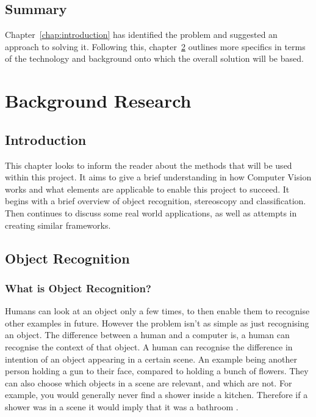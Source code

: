 \documentclass[11pt,oneside]{report}
\begin{document}
		\section{Summary}
		Chapter~\ref{chap:introduction} has identified the problem and suggested an approach to solving it.
		Following this, chapter~\ref{chap:background} outlines more specifics in terms of the technology and background onto which the overall solution will be based.
		
	\chapter{Background Research}\label{chap:background}
			\section{Introduction}
			This chapter looks to inform the reader about the methods that will be used within this project.
			It aims to give a brief understanding in how Computer Vision works and what elements are applicable to enable this project to succeed.
			It begins with a brief overview of object recognition, stereoscopy and classification.
			Then continues to discuss some real world applications, as well as attempts in creating similar frameworks.
			

			\section{Object Recognition}
				\subsection{What is Object Recognition?}
				Humans can look at an object only a few times, to then enable them to recognise other examples in future.
				However the problem isn't as simple as just recognising an object.
				The difference between a human and a computer is, a human can recognise the context of that object.
				A human can recognise the difference in intention of an object appearing in a certain scene.
				An example being another person holding a gun to their face, compared to holding a bunch of flowers.
				They can also choose which objects in a scene are relevant, and which are not.
				For example, you would generally never find a shower inside a kitchen.
				Therefore if a shower was in a scene it would imply that it was a bathroom \cite{book:modern}.
				
\end{document}
